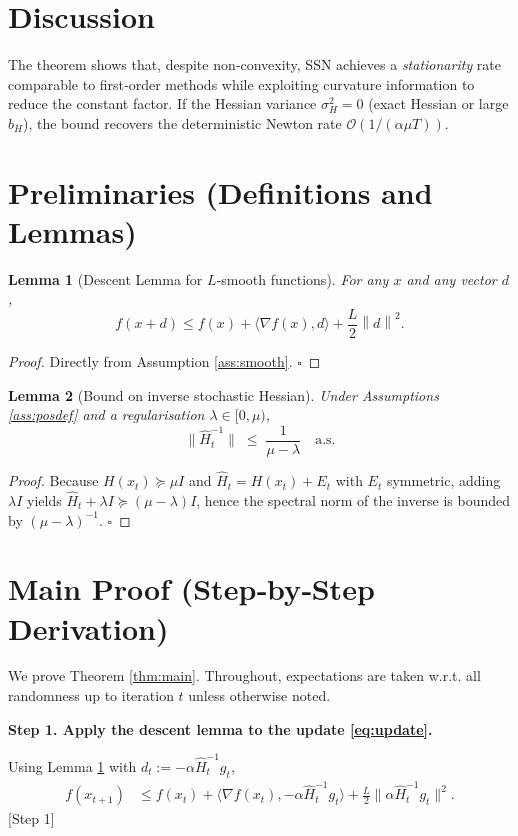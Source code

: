 \documentclass{article}
\newtheorem{lemma}{Lemma}
\newcommand{\norm}[1]{\left\lVert#1\right\rVert}
\newcommand{\grad}{\nabla}
\begin{document}
\section*{Discussion}
The theorem shows that, despite non‑convexity, SSN achieves a \emph{stationarity} rate comparable to first‑order methods while exploiting curvature information to reduce the constant factor. If the Hessian variance $\sigma_H^{2}=0$ (exact Hessian or large $b_H$), the bound recovers the deterministic Newton rate $\mathcal{O}(1/(\alpha\mu T))$.

\newpage
\section*{Preliminaries (Definitions and Lemmas)}
\begin{lemma}[Descent Lemma for $L$‑smooth functions]\label{lem:descent}
For any $x$ and any vector $d$,
\[
f(x+d)\le f(x)+\langle\grad f(x),d\rangle+\frac{L}{2}\norm{d}^{2}.
\]
\end{lemma}
\begin{proof}
Directly from Assumption \ref{ass:smooth}. \hfill $\square$
\end{proof}

\begin{lemma}[Bound on inverse stochastic Hessian]\label{lem:hessian_inv}
Under Assumptions \ref{ass:posdef} and a regularisation $\lambda\in[0,\mu)$,
\[
\bigl\|\widehat H_t^{-1}\bigr\|\;\le\;\frac{1}{\mu-\lambda}\quad\text{a.s.}
\]
\end{lemma}
\begin{proof}
Because $H(x_t)\succeq\mu I$ and $\widehat H_t=H(x_t)+E_t$ with $E_t$ symmetric, adding $\lambda I$ yields $\widehat H_t+\lambda I\succeq (\mu-\lambda)I$, hence the spectral norm of the inverse is bounded by $(\mu-\lambda)^{-1}$. \hfill $\square$
\end{proof}

\section*{Main Proof (Step‑by‑Step Derivation)}
We prove Theorem \ref{thm:main}. Throughout, expectations are taken w.r.t. all randomness up to iteration $t$ unless otherwise noted.

\noindent\textbf{Step 1. Apply the descent lemma to the update \eqref{eq:update}.}  

Using Lemma \ref{lem:descent} with $d_t:=-\alpha\widehat H_t^{-1}g_t$,
\begin{align}
f(x_{t+1}) &\le f(x_t)+\big\langle\grad f(x_t),-\alpha\widehat H_t^{-1}g_t\big\rangle
+\frac{L}{2}\big\|\alpha\widehat H_t^{-1}g_t\big\|^{2}.
\tag{1}
\end{align}
[Step 1]
\end{document}
